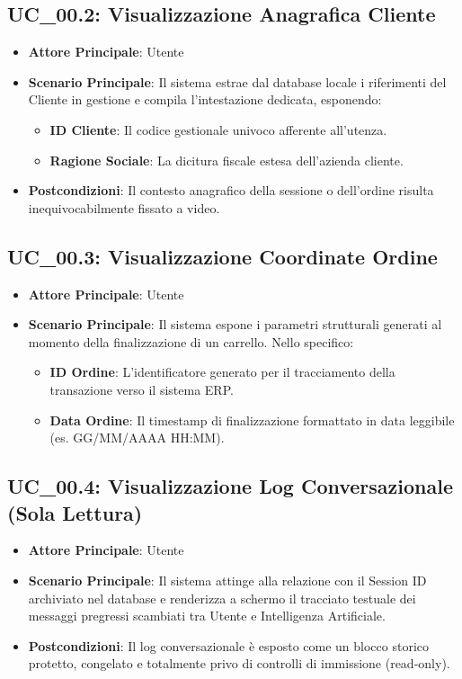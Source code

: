 \subsection{UC\_00.2: Visualizzazione Anagrafica Cliente}
\label{uc_00.2}
\begin{itemize}
    \item \textbf{Attore Principale}: Utente
    \item \textbf{Scenario Principale}: Il sistema estrae dal database locale i riferimenti del Cliente in gestione e compila l'intestazione dedicata, esponendo:
    \begin{itemize}
        \item \textbf{ID Cliente}: Il codice gestionale univoco afferente all'utenza.
        \item \textbf{Ragione Sociale}: La dicitura fiscale estesa dell'azienda cliente.
    \end{itemize}
    \item \textbf{Postcondizioni}: Il contesto anagrafico della sessione o dell'ordine risulta inequivocabilmente fissato a video.
\end{itemize}

\subsection{UC\_00.3: Visualizzazione Coordinate Ordine}
\label{uc_00.3}
\begin{itemize}
    \item \textbf{Attore Principale}: Utente
    \item \textbf{Scenario Principale}: Il sistema espone i parametri strutturali generati al momento della finalizzazione di un carrello. Nello specifico:
    \begin{itemize}
        \item \textbf{ID Ordine}: L'identificatore generato per il tracciamento della transazione verso il sistema ERP.
        \item \textbf{Data Ordine}: Il timestamp di finalizzazione formattato in data leggibile (es. GG/MM/AAAA HH:MM).
    \end{itemize}
\end{itemize}

\subsection{UC\_00.4: Visualizzazione Log Conversazionale (Sola Lettura)}
\label{uc_00.4}
\begin{itemize}
    \item \textbf{Attore Principale}: Utente
    \item \textbf{Scenario Principale}: Il sistema attinge alla relazione con il Session ID archiviato nel database e renderizza a schermo il tracciato testuale dei messaggi pregressi scambiati tra Utente e Intelligenza Artificiale.
    \item \textbf{Postcondizioni}: Il log conversazionale è esposto come un blocco storico protetto, congelato e totalmente privo di controlli di immissione (read-only).
\end{itemize}


